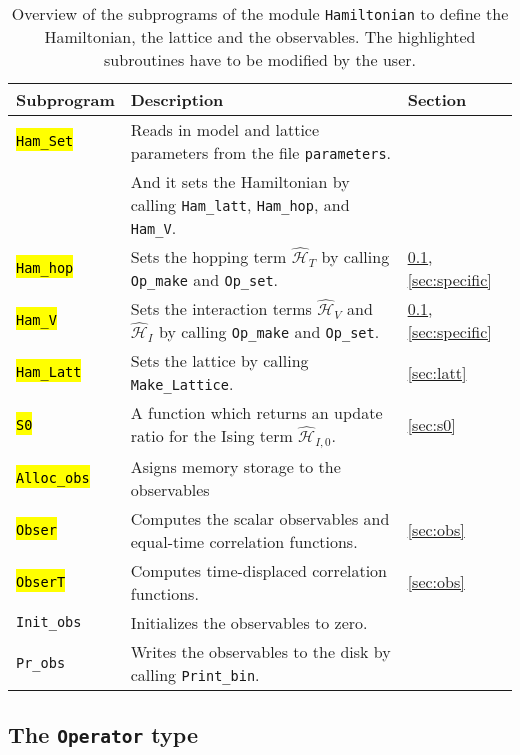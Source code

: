 %
\begin{table}[h]
    \begin{tabular}{@{} l l l @{}}\toprule
    Subprogram & Description & Section \\\midrule
    \hl{\texttt{Ham\_Set}}  & Reads in model and lattice parameters from the file \texttt{parameters}. \\
                       & And it sets the Hamiltonian by calling \texttt{Ham\_latt}, \texttt{Ham\_hop}, and \texttt{Ham\_V}. & \\
    \hl{\texttt{Ham\_hop}}  & Sets the hopping term  $\hat{\mathcal{H}}_{T}$ by calling \texttt{Op\_make} and \texttt{Op\_set}. & \ref{sec:op}, \ref{sec:specific}\\
    \hl{\texttt{Ham\_V}}    & Sets the interaction terms  $\hat{\mathcal{H}}_{V}$ and $\hat{\mathcal{H}}_{I}$ 
                         by calling \texttt{Op\_make} and \texttt{Op\_set}.& \ref{sec:op}, \ref{sec:specific}\\  
    \hl{\texttt{Ham\_Latt}} & Sets the lattice by calling \texttt{Make\_Lattice}.& \ref{sec:latt}\\
    \hl{\texttt{S0}}        & A function which returns an update ratio for the Ising term $\hat{\mathcal{H}}_{I,0}$. 
    & \ref{sec:s0} \\
    \hl{\texttt{Alloc\_obs}} & Asigns memory storage to the observables & \\
    \hl{\texttt{Obser}}      & Computes the scalar observables and equal-time correlation functions. & \ref{sec:obs} \\
    \hl{\texttt{ObserT}}     & Computes time-displaced correlation functions. & \ref{sec:obs}\\
    \texttt{Init\_obs}  & Initializes the observables to zero. & \\    
    \texttt{Pr\_obs}    & Writes the observables to the disk by calling \texttt{Print\_bin}. \\\bottomrule    
   \end{tabular}
   \caption{Overview of the subprograms of the  module \texttt{Hamiltonian} to define the Hamiltonian, the lattice and the observables. 
   The highlighted subroutines have to be modified by the user.
    \label{table:hamiltonian}}
\end{table}
%

\subsection{The \texttt{Operator} type}\label{sec:op}


